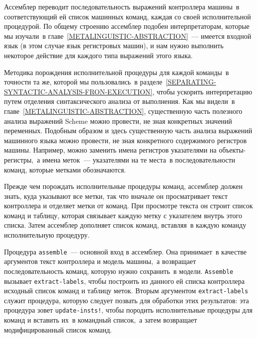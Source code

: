  Ассемблер переводит
последовательность выражений 
контроллера машины~в соответствующий ей список машинных команд,
каждая со своей исполнительной процедурой.  По общему строению
ассемблер подобен интерпретаторам, которые мы изучали~в 
главе~\ref{METALINGUISTIC-ABSTRACTION}~--- имеется входной язык
(в этом случае язык регистровых машин), и нам нужно выполнить
некоторое действие для каждого типа выражений этого языка.

Методика порождения исполнительной процедуры для каждой
команды~в точности та же, которой мы пользовались~в 
разделе~\ref{SEPARATING-SYNTACTIC-ANALYSIS-FRON-EXECUTION}, чтобы
ускорить интерпретацию путем 
отделения синтаксического анализа от
выполнения.  Как мы видели~в главе~\ref{METALINGUISTIC-ABSTRACTION}, 
существенную часть
полезного анализа выражений Scheme можно провести, не зная конкретных
значений переменных.  Подобным образом и здесь существенную часть
анализа выражений машинного языка можно провести, не зная конкретного
содержимого регистров машины.  Например, можно заменить имена регистров
указателями на объекты-регистры,~а имена меток~---
указателями на те места~в последовательности команд, которые метками
обозначаются.

Прежде чем порождать исполнительные процедуры
команд, ассемблер должен знать, куда указывают все метки, так что
вначале он просматривает текст контроллера и отделяет метки от
команд. При просмотре текста он строит список команд и таблицу,
которая связывает каждую метку с указателем внутрь этого списка.  Затем
ассемблер дополняет список команд, вставляя~в каждую команду
исполнительную процедуру.

Процедура {\tt assemble}~--- основной вход в
ассемблер.  Она принимает~в качестве аргументов текст контроллера и
модель машины,~а возвращает последовательность команд, которую нужно
сохранить~в модели. {\tt Assemble} вызывает
{\tt extract-labels}, чтобы построить из данного ей списка
контроллера исходный список команд и таблицу меток.  Вторым аргументом
{\tt extract-labels} служит процедура, которую следует позвать
для обработки этих результатов: эта процедура зовет
{\tt update-insts!}, чтобы породить исполнительные процедуры
для команд и вставить их~в командный список,~а затем возвращает
модифицированный список команд.

